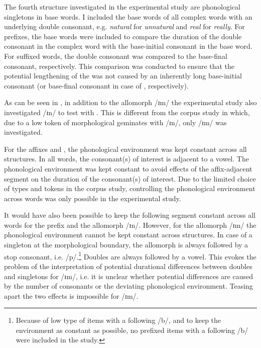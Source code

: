 The fourth structure investigated in the experimental study are phonological singletons in base words. I included the base words of all complex words with an underlying double consonant, e.g. \textit{natural} for \textit{unnatural} and \textit{real} for \textit{really}. For prefixes, the base words were included to compare the duration of the double consonant in the complex word with the base-initial consonant in the base word. For suffixed words, the double consonant was compared to the base-final consonant, respectively. This comparison was conducted to ensure that the potential lengthening of the  was not caused by an inherently long base-initial consonant (or base-final consonant in case of , respectively).


As can be seen in , in addition to  the allomorph /ɪm/  the experimental study also investigated /ɪn/ to test  with  . This is different from the corpus study in which, due to a low token  of morphological {geminates} with /ɪn/, only /ɪm/ was investigated.  

For the affixes  and , the phonological environment was kept constant across all structures. In all words, the consonant(s) of interest is adjacent to a vowel. 
The phonological environment was kept constant to avoid effects of the affix-adjacent segment on the duration of the consonant(s) of interest. Due to the limited choice of types and tokens in the corpus study, controlling the phonological environment across words was only possible in the experimental study.%

It would have also been possible to keep the following segment constant across all words for the prefix  and the allomorph /ɪn/. However, for the allomorph /ɪm/ the phonological environment cannot be kept constant across structures. In case of a singleton at the morphological boundary, the allomorph is always followed  by a stop consonant, i.e. /p/.\footnote{Because of low type  of items with a following /b/, and to keep the environment as constant as possible, no  prefixed items with a following /b/ were included in the study.} Doubles are always followed by a vowel. This evokes the problem of the interpretation of potential durational differences between doubles and singletons for /ɪm/, i.e. it is unclear whether potential differences are caused by the number of consonants or the deviating phonological environment. Teasing apart the two effects is impossible for /ɪm/.

